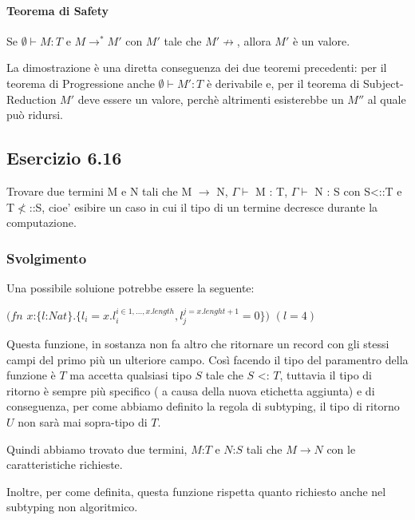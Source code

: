 \paragraph{Teorema di Safety}
\begin{centering}
	Se $\emptyset \vdash M :T$ e $M \to^* M'$ con $M'$ tale che $M' \not\to$, allora $M'$ \`e un valore.
\end{centering}

\noindent La dimostrazione \`e una diretta conseguenza dei due teoremi precedenti: per il teorema di Progressione anche $\emptyset \vdash M': T$ \`e derivabile e, per il teorema di Subject-Reduction $M'$ deve essere un valore, perch\`e altrimenti esisterebbe un $M''$ al quale pu\`o ridursi.


\subsection*{Esercizio 6.16}
Trovare due termini M e N tali che M $\rightarrow$ N, $\Gamma\vdash$ M : T, $\Gamma\vdash$ N : S con S<::T e T$\nless$::S, cioe' esibire un caso in cui il tipo di un termine decresce durante la computazione. 
\subsubsection*{Svolgimento}
Una possibile soluione potrebbe essere la seguente:

$ (fn$ $x$:$\{l$:$Nat\}.\{l_i = x.l_i^{i \in 1,...,x.length},l_j^{j=x.lenght+1} = 0\})$ $({l=4})$

Questa funzione, in sostanza non fa altro che ritornare un record con gli stessi campi del primo pi\`u un ulteriore campo.
Cos\`i facendo il tipo del paramentro della funzione \`e $T$  ma accetta qualsiasi tipo $S$ tale che $S$ <: $T$, tuttavia il tipo di ritorno \`e sempre pi\`u specifico ( a causa della nuova etichetta aggiunta) e di conseguenza, per come abbiamo definito la regola di subtyping, il tipo di ritorno $U$ non sar\`a mai sopra-tipo di $T$.

Quindi abbiamo trovato due termini, $M$:$T$ e $N$:$S$ tali che $M \rightarrow N$ con le caratteristiche richieste.

Inoltre, per come definita, questa funzione rispetta quanto richiesto anche nel subtyping non algoritmico.